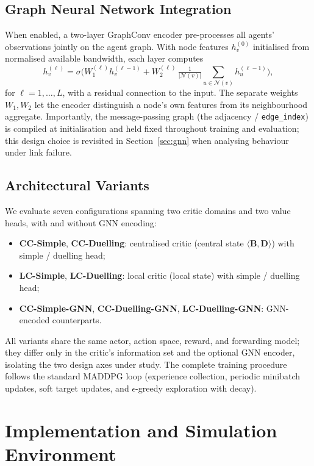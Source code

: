 \documentclass[10pt,journal,comsoc]{IEEEtran}
\begin{document}
\subsection{Graph Neural Network Integration}
When enabled, a two-layer GraphConv encoder pre-processes all agents' observations jointly on the agent graph. With node features $h_v^{(0)}$ initialised from normalised available bandwidth, each layer computes
\begin{equation}
  h_v^{(\ell)} = \sigma\!\Big(W_1^{(\ell)} h_v^{(\ell-1)} + W_2^{(\ell)}\,\tfrac{1}{|\mathcal{N}(v)|}\!\sum_{u\in\mathcal{N}(v)} h_u^{(\ell-1)}\Big),
  \label{eq:gnn_layer}
\end{equation}
for $\ell=1,\dots,L$, with a residual connection to the input. The separate weights $W_1,W_2$ let the encoder distinguish a node's own features from its neighbourhood aggregate. Importantly, the message-passing graph (the adjacency / \texttt{edge\_index}) is compiled at initialisation and held fixed throughout training and evaluation; this design choice is revisited in Section~\ref{sec:gnn} when analysing behaviour under link failure.

\subsection{Architectural Variants}
We evaluate seven configurations spanning two critic domains and two value heads, with and without GNN encoding:
\begin{itemize}
  \item \textbf{CC-Simple}, \textbf{CC-Duelling}: centralised critic (central state $\langle\mathbf{B},\mathbf{D}\rangle$) with simple / duelling head;
  \item \textbf{LC-Simple}, \textbf{LC-Duelling}: local critic (local state) with simple / duelling head;
  \item \textbf{CC-Simple-GNN}, \textbf{CC-Duelling-GNN}, \textbf{LC-Duelling-GNN}: GNN-encoded counterparts.
\end{itemize}
All variants share the same actor, action space, reward, and forwarding model; they differ only in the critic's information set and the optional GNN encoder, isolating the two design axes under study. The complete training procedure follows the standard MADDPG loop (experience collection, periodic minibatch updates, soft target updates, and $\epsilon$-greedy exploration with decay).

\section{Implementation and Simulation Environment} \label{expSetup}
\end{document}
